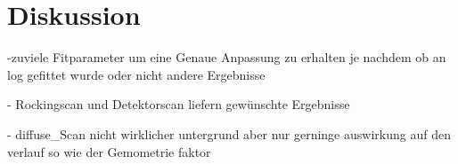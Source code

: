 \section{Diskussion}
\label{sec:Diskussion}










-zuviele Fitparameter um eine Genaue Anpassung zu erhalten
 je nachdem ob an log gefittet wurde oder nicht andere Ergebnisse

- Rockingscan und Detektorscan liefern gewünschte Ergebnisse

- diffuse_Scan nicht wirklicher untergrund aber nur gerninge auswirkung auf den verlauf so
wie der Gemometrie faktor
